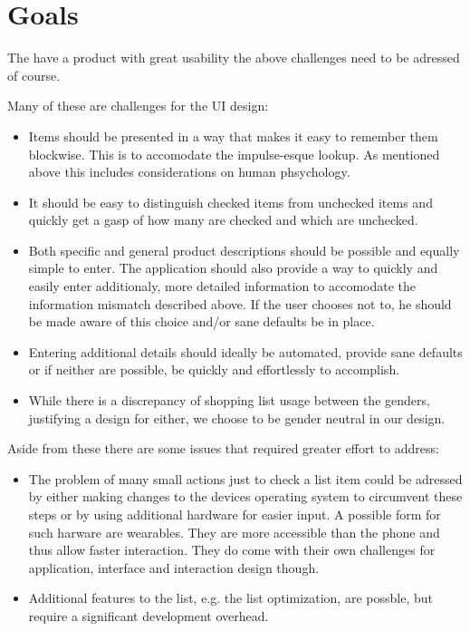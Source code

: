 \documentclass{scrartcl}
\begin{document}
\section{Goals}
\label{sec:goal}
The have a product with great usability the above challenges need to be adressed of course.

Many of these are challenges for the UI design:
\begin{itemize}
  \item Items should be presented in a way that makes it easy to remember them blockwise. This is to accomodate the impulse-esque lookup. 
    As mentioned above this includes considerations on human phsychology.
  \item It should be easy to distinguish checked items from unchecked items and quickly get a gasp of how many are checked and which are unchecked.
  \item Both specific and general product descriptions should be possible and equally simple to enter. 
    The application should also provide a way to quickly and easily enter additionaly, more detailed information to accomodate the information mismatch described above.
    If the user chooses not to, he should be made aware of this choice and/or sane defaults be in place.
  \item Entering additional details should ideally be automated, provide sane defaults or if neither are possible, be quickly and effortlessly to accomplish.

  \item While there is a discrepancy of shopping list usage between the genders, justifying a design for either, we choose to be gender neutral in our design. 
\end{itemize}

Aside from these there are some issues that required greater effort to address:
\begin{itemize}
  \item The problem of many small actions just to check a list item could be adressed by either making changes to the devices operating system to circumvent these steps or by using additional hardware for easier input.
    A possible form for such harware are wearables. They are more accessible than the phone and thus allow faster interaction. 
    They do come with their own challenges for application, interface and interaction design though.
  \item Additional features to the list, e.g. the list optimization, are possble, but require a significant development overhead. 
\end{itemize}
\end{document}
